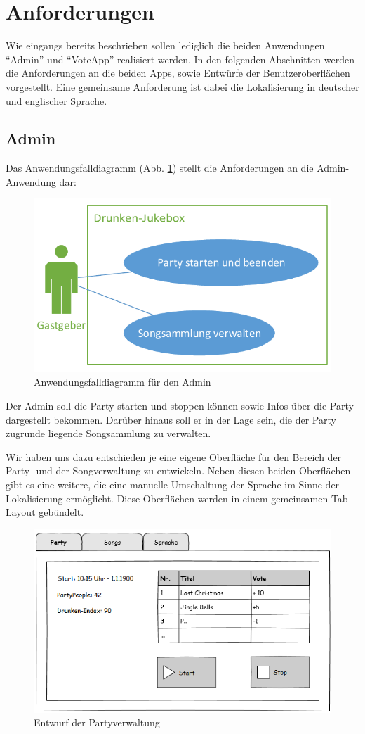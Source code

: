 \section{Anforderungen}
Wie eingangs bereits beschrieben sollen lediglich die beiden Anwendungen "`Admin"' und "`VoteApp"' realisiert werden. In den folgenden Abschnitten werden die Anforderungen an die beiden Apps, sowie Entwürfe der Benutzeroberflächen vorgestellt. Eine gemeinsame Anforderung ist dabei die Lokalisierung in deutscher und englischer Sprache.

\subsection{Admin}
Das Anwendungsfalldiagramm (Abb. \ref{fig:AdminUseCase}) stellt die Anforderungen an die Admin-Anwendung dar:

\begin{figure}[H]
\centering
\includegraphics[width=0.7\linewidth]{Bilder/AdminUseCase}
\caption{Anwendungsfalldiagramm für den Admin}
\label{fig:AdminUseCase}
\end{figure}

Der Admin soll die Party starten und stoppen können sowie Infos über die Party dargestellt bekommen. Darüber hinaus soll er in der Lage sein, die der Party zugrunde liegende Songsammlung zu verwalten.

Wir haben uns dazu entschieden je eine eigene Oberfläche für den Bereich der Party- und der Songverwaltung zu entwickeln. Neben diesen beiden Oberflächen gibt es eine weitere, die eine manuelle Umschaltung der Sprache im Sinne der Lokalisierung ermöglicht. Diese Oberflächen werden in einem gemeinsamen Tab-Layout gebündelt.
  
\begin{figure}[H]
\centering
\includegraphics[width=0.95\linewidth]{Bilder/MockParty}
\caption{Entwurf der Partyverwaltung}
\label{fig:MockParty}
\end{figure}

